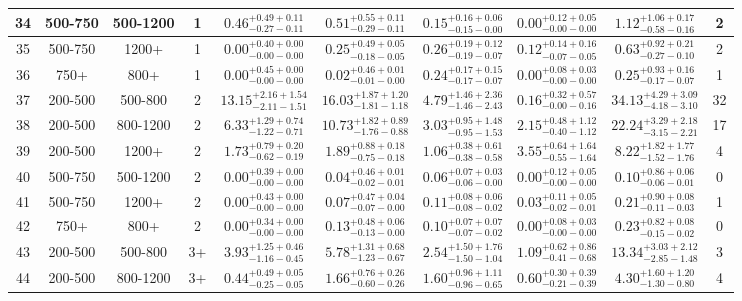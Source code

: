 \documentclass[11pt, oneside]{article}   	%
\begin{document}
\begin{table}
{\begin{tabular}{ |c|c|c|c||c|c|c|c||c|c| }
34 & 500-750 & 500-1200 & 1 & $0.46^{+0.49+0.11}_{-0.27-0.11}$ & $0.51^{+0.55+0.11}_{-0.29-0.11}$ & $0.15^{+0.16+0.06}_{-0.15-0.00}$ & $0.00^{+0.12+0.05}_{-0.00-0.00}$ & $1.12^{+1.06+0.17}_{-0.58-0.16}$ & 2 \\ \hline
35 & 500-750 & 1200+ & 1 & $0.00^{+0.40+0.00}_{-0.00-0.00}$ & $0.25^{+0.49+0.05}_{-0.18-0.05}$ & $0.26^{+0.19+0.12}_{-0.19-0.07}$ & $0.12^{+0.14+0.16}_{-0.07-0.05}$ & $0.63^{+0.92+0.21}_{-0.27-0.10}$ & 2 \\ \hline
36 & 750+ & 800+ & 1 & $0.00^{+0.45+0.00}_{-0.00-0.00}$ & $0.02^{+0.46+0.01}_{-0.01-0.00}$ & $0.24^{+0.17+0.15}_{-0.17-0.07}$ & $0.00^{+0.08+0.03}_{-0.00-0.00}$ & $0.25^{+0.93+0.16}_{-0.17-0.07}$ & 1 \\ \hline
37 & 200-500 & 500-800 & 2 & $13.15^{+2.16+1.54}_{-2.11-1.51}$ & $16.03^{+1.87+1.20}_{-1.81-1.18}$ & $4.79^{+1.46+2.36}_{-1.46-2.43}$ & $0.16^{+0.32+0.57}_{-0.00-0.16}$ & $34.13^{+4.29+3.09}_{-4.18-3.10}$ & 32 \\ \hline
38 & 200-500 & 800-1200 & 2 & $6.33^{+1.29+0.74}_{-1.22-0.71}$ & $10.73^{+1.82+0.89}_{-1.76-0.88}$ & $3.03^{+0.95+1.48}_{-0.95-1.53}$ & $2.15^{+0.48+1.12}_{-0.40-1.12}$ & $22.24^{+3.29+2.18}_{-3.15-2.21}$ & 17 \\ \hline
39 & 200-500 & 1200+ & 2 & $1.73^{+0.79+0.20}_{-0.62-0.19}$ & $1.89^{+0.88+0.18}_{-0.75-0.18}$ & $1.06^{+0.38+0.61}_{-0.38-0.58}$ & $3.55^{+0.64+1.64}_{-0.55-1.64}$ & $8.22^{+1.82+1.77}_{-1.52-1.76}$ & 4 \\ \hline
40 & 500-750 & 500-1200 & 2 & $0.00^{+0.39+0.00}_{-0.00-0.00}$ & $0.04^{+0.46+0.01}_{-0.02-0.01}$ & $0.06^{+0.07+0.03}_{-0.06-0.00}$ & $0.00^{+0.12+0.05}_{-0.00-0.00}$ & $0.10^{+0.86+0.06}_{-0.06-0.01}$ & 0 \\ \hline
41 & 500-750 & 1200+ & 2 & $0.00^{+0.43+0.00}_{-0.00-0.00}$ & $0.07^{+0.47+0.04}_{-0.07-0.00}$ & $0.11^{+0.08+0.06}_{-0.08-0.02}$ & $0.03^{+0.11+0.05}_{-0.02-0.01}$ & $0.21^{+0.90+0.08}_{-0.11-0.03}$ & 1 \\ \hline
42 & 750+ & 800+ & 2 & $0.00^{+0.34+0.00}_{-0.00-0.00}$ & $0.13^{+0.48+0.06}_{-0.13-0.00}$ & $0.10^{+0.07+0.07}_{-0.07-0.02}$ & $0.00^{+0.08+0.03}_{-0.00-0.00}$ & $0.23^{+0.82+0.08}_{-0.15-0.02}$ & 0 \\ \hline
43 & 200-500 & 500-800 & 3+ & $3.93^{+1.25+0.46}_{-1.16-0.45}$ & $5.78^{+1.31+0.68}_{-1.23-0.67}$ & $2.54^{+1.50+1.76}_{-1.50-1.04}$ & $1.09^{+0.62+0.86}_{-0.41-0.68}$ & $13.34^{+3.03+2.12}_{-2.85-1.48}$ & 3 \\ \hline
44 & 200-500 & 800-1200 & 3+ & $0.44^{+0.49+0.05}_{-0.25-0.05}$ & $1.66^{+0.76+0.26}_{-0.60-0.26}$ & $1.60^{+0.96+1.11}_{-0.96-0.65}$ & $0.60^{+0.30+0.39}_{-0.21-0.39}$ & $4.30^{+1.60+1.20}_{-1.30-0.80}$ & 4 \\ \hline

\end{tabular}}
\end{table}
\end{document}

